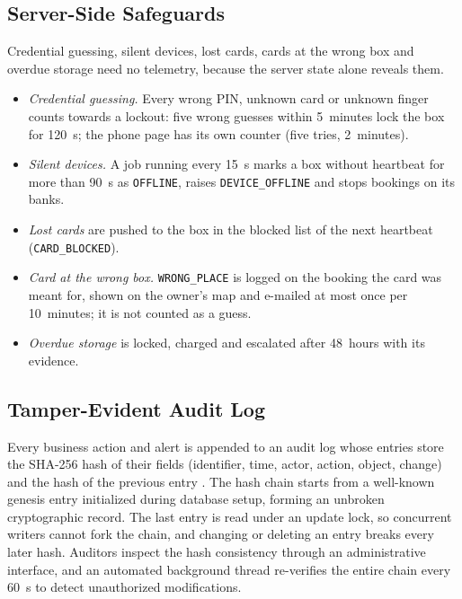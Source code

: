 \subsection{Server-Side Safeguards}

Credential guessing, silent devices, lost cards, cards at the wrong box and overdue storage need no telemetry, because
the server state alone reveals them.
\begin{itemize}
  \item \textit{Credential guessing.} Every wrong PIN, unknown card or unknown finger counts towards a lockout: five
        wrong guesses within 5~minutes lock the box for 120~s; the phone page has its own counter (five tries,
        2~minutes).
  \item \textit{Silent devices.} A job running every 15~s marks a box without heartbeat for more than 90~s as
        \texttt{OFFLINE}, raises \texttt{DEVICE\_OFFLINE} and stops bookings on its banks.
  \item \textit{Lost cards} are pushed to the box in the blocked list of the next heartbeat (\texttt{CARD\_BLOCKED}).
  \item \textit{Card at the wrong box.} \texttt{WRONG\_PLACE} is logged on the booking the card was meant for, shown
        on the owner's map and e-mailed at most once per 10~minutes; it is not counted as a guess.
  \item \textit{Overdue storage} is locked, charged and escalated after 48~hours with its evidence.
\end{itemize}

\subsection{Tamper-Evident Audit Log}

Every business action and alert is appended to an audit log whose entries store the SHA-256 hash of their fields
(identifier, time, actor, action, object, change) and the hash of the previous entry \cite{haber1991timestamp}. The
hash chain starts from a well-known genesis entry initialized during database setup, forming an unbroken cryptographic
record. The last entry is read under an update lock, so concurrent writers cannot fork the chain, and changing or
deleting an entry breaks every later hash. Auditors inspect the hash consistency through an administrative interface,
and an automated background thread re-verifies the entire chain every 60~s to detect unauthorized modifications.

